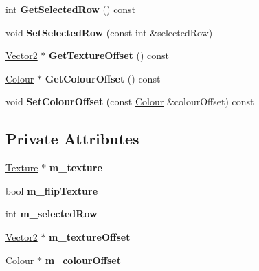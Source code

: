 \begin{DoxyCompactItemize}
int {\bfseries Get\+Selected\+Row} () const
\item 
\mbox{\label{class_flounder_1_1_gui_afc6e992f4ae5930f643908aeace53545}} 
void {\bfseries Set\+Selected\+Row} (const int \&selected\+Row)
\item 
\mbox{\label{class_flounder_1_1_gui_a5f339d228d4f52b3141f3f8d85e425ca}} 
\hyperlink{class_flounder_1_1_vector2}{Vector2} $\ast$ {\bfseries Get\+Texture\+Offset} () const
\item 
\mbox{\label{class_flounder_1_1_gui_acdc1db466860c91bfb4b85b83312dfce}} 
\hyperlink{class_flounder_1_1_colour}{Colour} $\ast$ {\bfseries Get\+Colour\+Offset} () const
\item 
\mbox{\label{class_flounder_1_1_gui_abcf276090f2243e98eccfb4ba105b52e}} 
void {\bfseries Set\+Colour\+Offset} (const \hyperlink{class_flounder_1_1_colour}{Colour} \&colour\+Offset) const
\end{DoxyCompactItemize}
\subsection*{Private Attributes}
\begin{DoxyCompactItemize}
\item 
\mbox{\label{class_flounder_1_1_gui_a49df9065d4650318c1e9692e786aede1}} 
\hyperlink{class_flounder_1_1_texture}{Texture} $\ast$ {\bfseries m\+\_\+texture}
\item 
\mbox{\label{class_flounder_1_1_gui_adc390ac9babbb0df5a9b6176ee0ba61d}} 
bool {\bfseries m\+\_\+flip\+Texture}
\item 
\mbox{\label{class_flounder_1_1_gui_abc2d2affeece66f82bc52f8c5ccaeed3}} 
int {\bfseries m\+\_\+selected\+Row}
\item 
\mbox{\label{class_flounder_1_1_gui_a6e5ab7646f29e139ca83fef9cdcfc603}} 
\hyperlink{class_flounder_1_1_vector2}{Vector2} $\ast$ {\bfseries m\+\_\+texture\+Offset}
\item 
\mbox{\label{class_flounder_1_1_gui_a75489a01068bc96ba8251a4e3b37914c}} 
\hyperlink{class_flounder_1_1_colour}{Colour} $\ast$ {\bfseries m\+\_\+colour\+Offset}
\end{DoxyCompactItemize}


